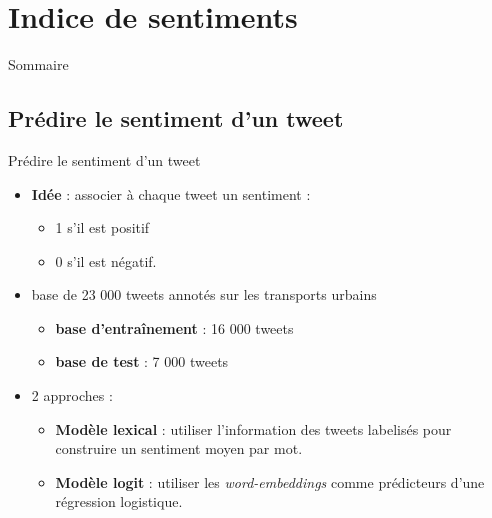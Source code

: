 \documentclass[10pt,xcolor=table,color={dvipsnames,usenames},ignorenonframetext,usepdftitle=false,french]{beamer}
\providecommand{\tightlist}{%
  \setlength{\parskip}{0pt}
  }
\begin{document}
\hypertarget{indice-de-sentiments}{%
\section{Indice de sentiments}\label{indice-de-sentiments}}

\begin{frame}{Sommaire}
\protect\hypertarget{sommaire-2}{}


\end{frame}

\hypertarget{pruxe9dire-le-sentiment-dun-tweet}{%
\subsection{Prédire le sentiment d'un
tweet}\label{pruxe9dire-le-sentiment-dun-tweet}}

\begin{frame}{Prédire le sentiment d'un tweet}
\protect\hypertarget{pruxe9dire-le-sentiment-dun-tweet-1}{}

\begin{itemize}
\tightlist
\item
  \textbf{Idée} : associer à chaque tweet un sentiment :

  \begin{itemize}
  \tightlist
  \item
    1 s'il est positif
  \item
    0 s'il est négatif.
  \end{itemize}
\end{itemize}

\medskip

\begin{itemize}
\tightlist
\item
  base de 23 000 tweets annotés sur les transports urbains

  \begin{itemize}
  \tightlist
  \item
    \textbf{base d'entraînement} : 16 000 tweets
  \item
    \textbf{base de test} : 7 000 tweets
  \end{itemize}
\end{itemize}

\medskip

\begin{itemize}
\tightlist
\item
  2 approches :

  \begin{itemize}
  \tightlist
  \item
    \textbf{Modèle lexical} : utiliser l'information des tweets
    labelisés pour construire un sentiment moyen par mot.
  \item
    \textbf{Modèle logit} : utiliser les \emph{word-embeddings} comme
    prédicteurs d'une régression logistique.
  \end{itemize}
\end{itemize}

\end{frame}
\end{document}

